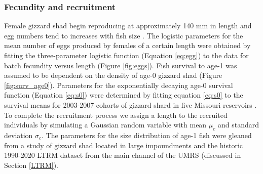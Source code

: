 \documentclass[preprint,review,12pt,authoryear]{elsarticle}
\begin{document}
\subsubsection{Fecundity and recruitment}
Female gizzard shad begin reproducing at approximately 140 mm in length and egg numbers tend to increases with fish size \citep{jons1997ovarian}. 
The logistic parameters for the mean number of eggs produced by females of a certain length were obtained by fitting the three-parameter logistic function (Equation \ref{eq:egg}) to the data for batch fecundity versus length \citep{jons1997ovarian} (Figure \ref{fig:eggs}). 
Fish survival to age-1 was assumed to be dependent on the density of age-0 gizzard shad (Figure \ref{fig:surv_age0}).  
Parameters for the exponentially decaying age-0 survival function (Equation \ref{eq:s0}) were determined by fitting equation \ref{eq:s0} to the survival means for 2003-2007 cohorts of gizzard shard in five Missouri reservoirs \citep{michaletz2010overwinter}.
To complete the recruitment process we assign a length to the recruited individuals by simulating a Gaussian random variable with mean $\mu_c$ and standard deviation $\sigma_c$.
The parameters for the size distribution of age-1 fish were gleaned from a study of gizzard shad located in large impoundments \citep{michaletz2017variation} and the historic 1990-2020 LTRM dataset from the main channel of the UMRS (discussed in Section \ref{LTRM}).
\end{document}
